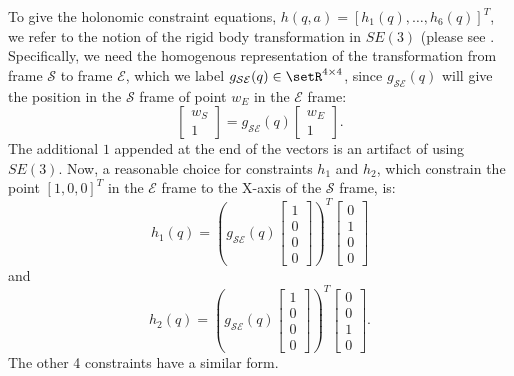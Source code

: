\documentclass[letterpaper, 10pt, conference]{ieeeconf}
\begin{document}
To give the holonomic constraint equations, $h(q,a) = [h_1(q),\ldots,h_6(q)]^T$, we refer to the notion of the rigid body transformation in $SE(3)$ (please see \cite{murray_li_sastry}.  Specifically, we need the homogenous representation of the transformation from frame $\mathcal{S}$ to frame $\mathcal{E}$, which we label $g_{\mathcal{S}\mathcal{E}}(q)\in\setR^{4\times 4}$, since $g_{\mathcal{S}\mathcal{E}}(q)$ will give the position in the $\mathcal{S}$ frame of point $w_E$ in the $\mathcal{E}$ frame:
\[
\left[\begin{array}{c} w_S \\ 1 \end{array}\right] = g_{\mathcal{S}\mathcal{E}}(q) \left[\begin{array}{c} w_E \\ 1 \end{array}\right].
\]
The additional $1$ appended at the end of the vectors is an artifact of using $SE(3)$.  Now, a reasonable choice for constraints $h_1$ and $h_2$, which constrain the point $[1, 0, 0]^T$ in the $\mathcal{E}$ frame to the X-axis of the $\mathcal{S}$ frame, is:
\begin{equation}
h_1(q) = \left(g_{\mathcal{S}\mathcal{E}}(q)  \left[\begin{array}{c} 1 \\ 0 \\ 0 \\ 0 \end{array}\right]\right)^T\left[\begin{array}{c} 0 \\ 1 \\ 0 \\ 0 \end{array}\right] 
\label{eq-h1}
\end{equation}
and
\begin{equation}
h_2(q) = \left(g_{\mathcal{S}\mathcal{E}}(q)  \left[\begin{array}{c} 1 \\ 0 \\ 0 \\ 0 \end{array}\right]\right)^T \left[\begin{array}{c} 0 \\ 0 \\ 1 \\ 0 \end{array}\right].
\label{eq-h2}
\end{equation}
The other 4 constraints have a similar form.  
\end{document}
